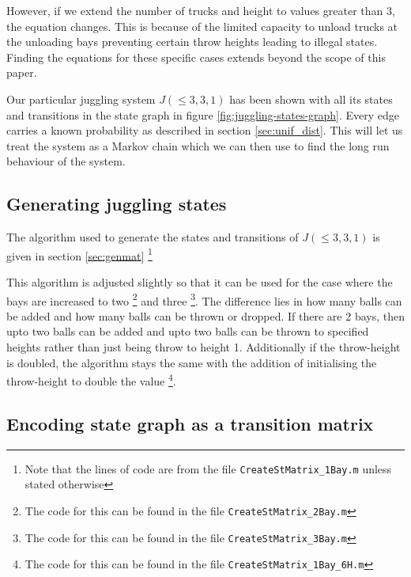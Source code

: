 \documentclass{article}
\theoremstyle{definition}
\theoremstyle{remark}
\numberwithin{equation}{section}
\begin{document}
However, if we extend the number of trucks and height to values greater than 3, the equation changes. This is because of the limited  capacity to unload trucks at the unloading bays preventing certain throw heights leading to illegal states. Finding the equations for these specific cases extends beyond the scope of this paper. 

Our particular juggling system $J(\leq3, 3, 1)$ has been shown with all its states and transitions in the state graph in figure \ref{fig:juggling-states-graph}. Every edge carries a known probability as described in section \ref{sec:unif_dist}. This will let us treat the system as a Markov chain which we can then use to find the long run behaviour of the system. 

\subsection{Generating juggling states} \label{sec:gen_juggle}
The algorithm used to generate the states and transitions of $J(\leq 3, 3, 1)$ is given in section \ref{sec:genmat} \footnote{Note that the lines of code are from the file \lstinline|CreateStMatrix_1Bay.m| unless stated otherwise}


This algorithm is adjusted slightly so that it can be used for the case where the bays are increased to two \footnote{The code for this can be found in the file \lstinline|CreateStMatrix_2Bay.m|} and three \footnote{The code for this can be found in the file \lstinline|CreateStMatrix_3Bay.m|}. The difference lies in how many balls can be added and how many balls can be thrown or dropped. If there are 2 bays, then upto two balls can be added and upto two balls can be thrown to specified heights rather than just being throw to height 1. Additionally if the throw-height is doubled, the algorithm stays the same with the addition of initialising the throw-height to double the value \footnote{The code for this can be found in the file \lstinline|CreateStMatrix_1Bay_6H.m|}.

\subsection{Encoding state graph as a transition matrix} \label{sec:trans_mat_meth}
\end{document}
